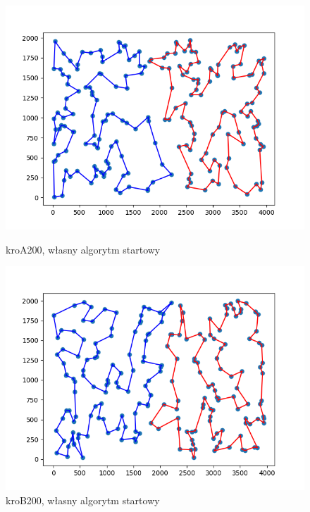 \documentclass[11pt]{article}
\begin{document}
\begin{figure}[H]
    \vspace{0.5cm}

    \begin{minipage}[t]{0.45\textwidth}
        \centering
        \includegraphics[width=\linewidth]{best_paths/kroA200/traverse_greedy/split_paths_regret_TSP}
        \caption{kroA200, własny algorytm startowy}
    \end{minipage}
    \hfill
    \begin{minipage}[t]{0.45\textwidth}
        \centering
        \includegraphics[width=\linewidth]{best_paths/kroB200/traverse_greedy/split_paths_regret_TSP}
        \caption{kroB200, własny algorytm startowy}
    \end{minipage}
    \label{fig:minipage-greedy-edge}
\end{figure}
\end{document}
